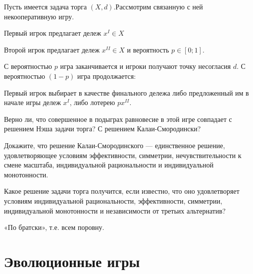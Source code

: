 \begin{problem}
 Пусть имеется задача торга $(X,d).$Рассмотрим связанную
с ней некооперативную игру.

Первый игрок предлагает дележ $x^{I}\in X$

Второй игрок предлагает дележ $x^{II}\in X$ и вероятность $p\in[0;1]$.

С вероятностью $p$ игра заканчивается и игроки получают точку несогласия
$d$. С вероятностью $(1-p)$ игра продолжается:

Первый игрок выбирает в качестве финального дележа либо предложенный
им в начале игры дележ $x^{I}$, либо лотерею $px^{II}$.

Верно ли, что совершенное в подыграх равновесие в этой игре совпадает
с решением Нэша задачи торга? С решением Калаи-Смородински?



\begin{sol}

\end{sol}
\end{problem}



\begin{problem}
Докажите, что решение Калаи-Смородинского — единственное
решение, удовлетворяющее условиям эффективности, симметрии, нечувствительности
к смене масштаба, индивидуальной рациональности и индивидуальной монотонности.



\begin{sol}

\end{sol}
\end{problem}



\begin{problem}
Какое решение задачи торга получится, если известно, что оно удовлетворяет
условиям индивидуальной рациональности, эффективности, симметрии,
индивидуальной монотонности и независимости от третьих альтернатив?



\begin{sol}
«По братски», т.е. всем поровну.
\end{sol}
\end{problem}




\section{Эволюционные игры}


